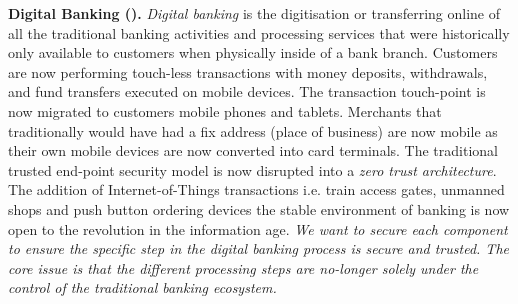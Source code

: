 \begin{Workpackage}{\thewpno}
\begin{Task}

\textbf{Digital Banking (\SOPRAshort{}).} \emph{Digital banking} is the digitisation or transferring online of all the traditional banking activities and processing services that were historically only available to customers when physically inside of a bank branch. Customers are now performing touch-less transactions with money deposits, withdrawals, and fund transfers executed on mobile devices. The transaction touch-point is now migrated to customers mobile phones and tablets. Merchants that traditionally would have had a fix address (place of business) are now mobile as their own mobile devices are now converted into card terminals. The traditional trusted end-point security model is now disrupted into a \emph{zero trust architecture}. The addition of Internet-of-Things transactions i.e. train access gates, unmanned shops and push button ordering devices the stable environment of banking is now open to the revolution in the information age. \emph{We want to secure each component to ensure the specific step in the digital banking process is secure and trusted. The core issue is that the different processing steps are no-longer solely under the control of the traditional banking ecosystem.}


\end{Task}
\end{Workpackage}
